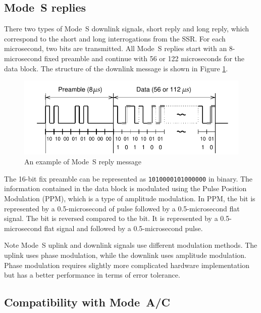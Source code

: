 \subsection{Mode~S replies}
There two types of Mode~S downlink signals, short reply and long reply, which correspond to the short and long interrogations from the SSR. For each microsecond, two bits are transmitted. All Mode~S replies start with an 8-microsecond fixed preamble and continue with 56 or 122 microseconds for the data block. The structure of the downlink message is shown in Figure \ref{fig:mode_s_downlink_pulses}.

\begin{figure}[ht]
  \includegraphics[scale=0.8]{figures/intro/mode_s_downlink_pulses.pdf}
  \caption{An example of Mode~S reply message}
  \label{fig:mode_s_downlink_pulses}
\end{figure}

The 16-bit fix preamble can be represented as \texttt{1010000101000000} in binary. The information contained in the data block is modulated using the Pulse Position Modulation (PPM), which is a type of amplitude modulation. In PPM, the \1 bit is represented by a 0.5-microsecond of pulse followed by a 0.5-microsecond flat signal. The \0 bit is reversed compared to the \1 bit. It is represented by a 0.5-microsecond flat signal and followed by a 0.5-microsecond pulse.

\begin{notebox}{Note}
  Mode~S uplink and downlink signals use different modulation methods. The uplink uses phase modulation, while the downlink uses amplitude modulation. Phase modulation requires slightly more complicated hardware implementation but has a better performance in terms of error tolerance. 
\end{notebox}

\subsection{Compatibility with Mode~A/C}

